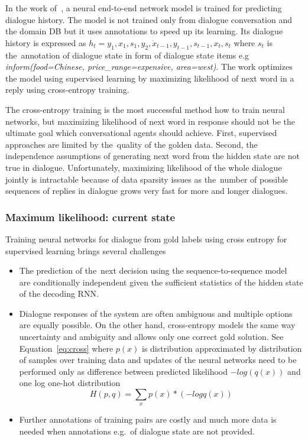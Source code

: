 \documentclass[11pt]{article}
\begin{document}
In the work of~\cite{wen_networkbased_2016}, a neural end-to-end network model is trained for predicting dialogue history.
The model is not trained only from dialogue conversation and the domain DB but it uses annotations to speed up its learning.
Its dialogue history is expressed as $h_t = y_1, x_1, s_1, y_2, \dot x_{t-1}, y_{t-1}, s_{t-1}, x_t, s_t $ where $s_t$ is the~annotation of dialogue state in form of dialogue state items e.g {\it inform(food=Chinese, price\_range=expensive, area=west)}.
The work optimizes the model using supervised learning by maximizing likelihood of next word in a reply using cross-entropy training.

The cross-entropy training is the most successful method how to train neural networks, but maximizing likelihood of next word in response should not be the ultimate goal which conversational agents should achieve.
First, supervised approaches are limited by the~quality of the golden data.
Second, the independence assumptions of generating next word from the hidden state are not true in dialogue.
Unfortunately, maximizing likelihood of the whole dialogue jointly is intractable because of data sparsity issues as the~number of possible sequences of replies in dialogue grows very fast for more and longer dialogues.


\subsubsection*{Maximum likelihood: current state}\label{sub:maximum_likelihood}
Training neural networks for dialogue from gold labels using cross entropy for supervised learning brings several challenges
\begin{itemize}
    \item The prediction of the~next decision using the sequence-to-sequence model~\cite{bahdanau_neural_2014,sutskever_sequence_2014} are conditionally independent given the sufficient statistics of the hidden state of the decoding RNN.
    \item Dialogue responses of the system are often ambiguous and multiple options are equally possible.
        On the other hand, cross-entropy models the same way uncertainty and ambiguity and allows only one correct gold solution.
        See Equation~\ref{eq:cross} where $p(x)$ is distribution approximated by distribution of samples over training data and updates of the neural networks need to be performed only as difference between predicted likelihood $-log(q(x))$ and one log one-hot distribution
        \begin{equation}\label{eq:cross}
            H(p, q) = \sum_{x}{p(x) * (- log q(x))}     
        \end{equation}
    \item Further annotations of training pairs are costly and much more data is needed when annotations e.g.\ of dialogue state are not provided.
\end{itemize}
\end{document}
